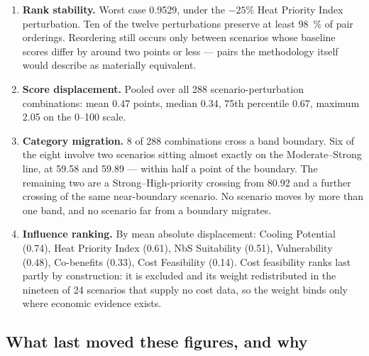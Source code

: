\begin{enumerate}
  \item \textbf{Rank stability.} Worst case \num[group-digits=none]{0.9529}, under the $-25\%$
  Heat Priority Index perturbation. Ten of the twelve perturbations preserve
  at least \SI{98}{\percent} of pair orderings. Reordering still occurs only
  between scenarios whose baseline scores differ by around two points or less
  --- pairs the methodology itself would describe as materially equivalent.

  \item \textbf{Score displacement.} Pooled over all \num{288}
  scenario-perturbation combinations: mean \num{0.47} points, median
  \num{0.34}, 75th percentile \num{0.67}, maximum \num{2.05} on the 0--100
  scale.

  \item \textbf{Category migration.} \num{8} of \num{288} combinations cross a
  band boundary. Six of the eight involve two scenarios sitting almost exactly
  on the Moderate--Strong line, at \num{59.58} and \num{59.89} --- within half
  a point of the boundary. The remaining two are a Strong--High-priority
  crossing from \num{80.92} and a further crossing of the same near-boundary
  scenario. No scenario moves by more than one band, and no scenario far from a
  boundary migrates.

  \item \textbf{Influence ranking.} By mean absolute displacement: Cooling
  Potential (\num{0.74}), Heat Priority Index (\num{0.61}), NbS Suitability
  (\num{0.51}), Vulnerability (\num{0.48}), Co-benefits (\num{0.33}), Cost
  Feasibility (\num{0.14}). Cost feasibility ranks last partly by construction:
  it is excluded and its weight redistributed in the nineteen of \num{24}
  scenarios that supply no cost data, so the weight binds only where economic
  evidence exists.
\end{enumerate}

\subsection{What last moved these figures, and why}
\label{sec:sa-moved}

